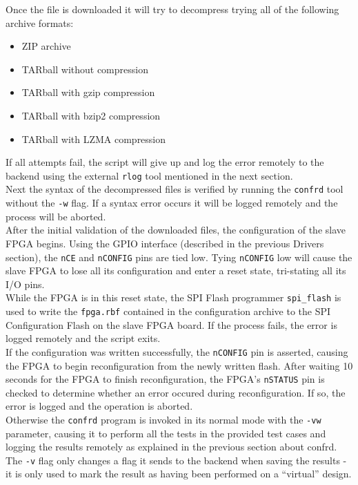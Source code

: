 Once the file is downloaded it will try to decompress trying all of the following archive formats:
\begin{itemize}
 \item ZIP archive
 \item TARball without compression
 \item TARball with gzip compression
 \item TARball with bzip2 compression
 \item TARball with LZMA compression 
\end{itemize}

If all attempts fail, the script will give up and log the error remotely to the backend using the
external \texttt{rlog} tool mentioned in the next section.
\\

Next the syntax of the decompressed files is verified by running the \texttt{confrd} tool
without the \texttt{-w} flag. If a syntax error occurs it will be logged remotely and the process
will be aborted.
\\

After the initial validation of the downloaded files, the configuration of the slave FPGA
begins. Using the GPIO interface (described in the previous Drivers section), the \texttt{nCE}
and \texttt{nCONFIG} pins are tied low. Tying \texttt{nCONFIG} low will cause the slave FPGA
to lose all its configuration and enter a reset state, tri-stating all its I/O pins.
\\

While the FPGA is in this reset state, the SPI Flash programmer \texttt{spi\_flash} is used
to write the \texttt{fpga.rbf} contained in the configuration archive to the SPI Configuration
Flash on the slave FPGA board. If the process fails, the error is logged remotely and the
script exits.
\\

If the configuration was written successfully, the \texttt{nCONFIG} pin is asserted, causing
the FPGA to begin reconfiguration from the newly written flash. After waiting 10 seconds
for the FPGA to finish reconfiguration, the FPGA's \texttt{nSTATUS} pin is checked to determine
whether an error occured during reconfiguration. If so, the error is logged and the operation
is aborted.
\\

Otherwise the \texttt{confrd} program is invoked in its normal mode with the \texttt{-vw} parameter,
causing it to perform all the tests in the provided test cases and logging the results remotely
as explained in the previous section about confrd. The \texttt{-v} flag only changes a flag it sends
to the backend when saving the results - it is only used to mark the result as having been performed
on a ``virtual'' design.


